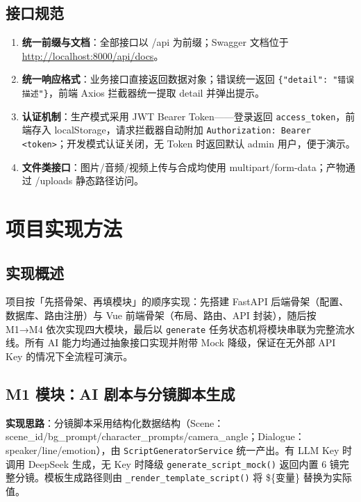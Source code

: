 \documentclass[12pt]{ctexrep}
\begin{document}
\section{接口规范}

\begin{enumerate}
\item \textbf{统一前缀与文档}：全部接口以 /api 为前缀；Swagger 文档位于 \url{http://localhost:8000/api/docs}。
\item \textbf{统一响应格式}：业务接口直接返回数据对象；错误统一返回 \texttt{\{"detail": "错误描述"\}}，前端 Axios 拦截器统一提取 detail 并弹出提示。
\item \textbf{认证机制}：生产模式采用 JWT Bearer Token——登录返回 \texttt{access\_token}，前端存入 localStorage，请求拦截器自动附加 \texttt{Authorization: Bearer <token>}；开发模式认证关闭，无 Token 时返回默认 admin 用户，便于演示。
\item \textbf{文件类接口}：图片/音频/视频上传与合成均使用 multipart/form-data；产物通过 /uploads 静态路径访问。
\end{enumerate}

\chapter{项目实现方法}
\section{实现概述}

项目按「先搭骨架、再填模块」的顺序实现：先搭建 FastAPI 后端骨架（配置、数据库、路由注册）与 Vue 前端骨架（布局、路由、API 封装），随后按 M1→M4 依次实现四大模块，最后以 \texttt{generate} 任务状态机将模块串联为完整流水线。所有 AI 能力均通过抽象接口实现并附带 Mock 降级，保证在无外部 API Key 的情况下全流程可演示。

\section{M1 模块：AI 剧本与分镜脚本生成}

\textbf{实现思路}：分镜脚本采用结构化数据结构（Scene：scene\_id/bg\_prompt/character\_prompts/camera\_angle；Dialogue：speaker/line/emotion），由 \texttt{ScriptGeneratorService} 统一产出。有 LLM Key 时调用 DeepSeek 生成，无 Key 时降级 \texttt{generate\_script\_mock()} 返回内置 6 镜完整分镜。模板生成路径则由 \texttt{\_render\_template\_script()} 将 \$\{变量\} 替换为实际值。
\end{document}
